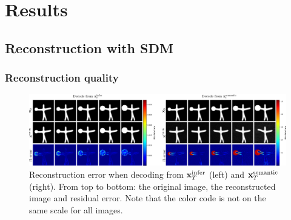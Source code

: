 \chapter{Results}
\label{chap:result}

\minitoc 

\section{Reconstruction with SDM}
\label{sec:result-sdm}

\subsection{Reconstruction quality}
\label{sec:result-reconstruction-error}

\begin{figure}
    \centering
    \includegraphics[width=0.75\linewidth]{figures/compare-effect-infer.png}
    \caption[Reconstructions from random noise and from stochastic subcode]{Reconstruction error when decoding from ${\mathbf{x}}_T^{\text{infer}}$ (left) and ${\mathbf{x}}_T^{\text{semantic}}$ (right). From top to bottom: the original image, the reconstructed image and residual error. Note that the color code is not on the same scale for all images.}
    \label{fig:compare-effect-infer}
\end{figure}

